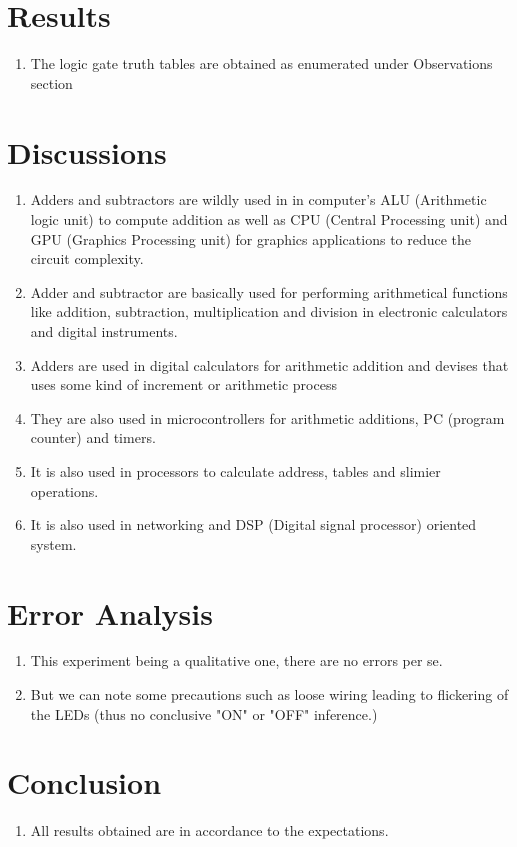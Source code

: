 \section{Results}
\begin{enumerate}
    \item The logic gate truth tables are obtained as enumerated under Observations section
\end{enumerate}
\section{Discussions}
\begin{enumerate}
    \item Adders and subtractors are wildly used in in computer’s ALU (Arithmetic logic unit) to compute addition as well as CPU (Central Processing unit) and GPU (Graphics Processing unit) for graphics applications to reduce the circuit complexity. 
    \item Adder and subtractor are basically used for performing arithmetical functions like addition, subtraction, multiplication and division in electronic calculators and digital instruments.
    \item Adders are used in digital calculators for arithmetic addition and devises that uses some kind of increment or arithmetic process
    \item They are also used in microcontrollers for arithmetic additions, PC (program counter) and timers.
    \item It is also used in processors to calculate address, tables and slimier operations.
    \item It is also used in networking and DSP (Digital signal processor) oriented system.
\end{enumerate}
\section{Error Analysis}
\begin{enumerate}
    \item This experiment being a qualitative one, there are no errors per se.
    \item But we can note some precautions such as loose wiring leading to flickering of the LEDs (thus no conclusive "ON" or "OFF" inference.)
\end{enumerate}
\section{Conclusion}
\begin{enumerate}
    \item All results obtained are in accordance to the expectations.
\end{enumerate}